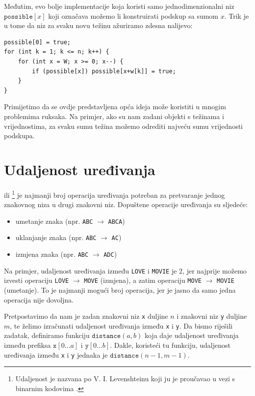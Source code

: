 Međutim, evo bolje implementacije koja koristi samo
jednodimenzionalni niz $\texttt{possible}[x]$
koji označava možemo li konstruirati podskup sa sumom $x$.
Trik je u tome da niz za svaku novu težinu
ažuriramo zdesna nalijevo:
\begin{lstlisting}
possible[0] = true;
for (int k = 1; k <= n; k++) {
    for (int x = W; x >= 0; x--) {
        if (possible[x]) possible[x+w[k]] = true;
    }
}
\end{lstlisting}

Primijetimo da se ovdje predstavljena opća ideja može koristiti
u mnogim problemima ruksaka.
Na primjer, ako su nam zadani objekti s težinama i vrijednostima,
za svaku sumu težina možemo odrediti najveću sumu
vrijednosti podskupa.

\section{Udaljenost uređivanja}


 ili \footnote{Udaljenost
je nazvana po V. I. Levenshteinu koji ju je proučavao u vezi s binarnim kodovima \cite{lev66}.}
je najmanji broj operacija uređivanja
potreban za pretvaranje jednog znakovnog niza
u drugi znakovni niz.
Dopuštene operacije uređivanja su sljedeće:
\begin{itemize}
\item umetanje znaka (npr. \texttt{ABC} $\rightarrow$ \texttt{ABCA})
\item uklanjanje znaka (npr. \texttt{ABC} $\rightarrow$ \texttt{AC})
\item izmjena znaka (npr. \texttt{ABC} $\rightarrow$ \texttt{ADC})
\end{itemize}

Na primjer, udaljenost uređivanja između
\texttt{LOVE} i \texttt{MOVIE} je 2,
jer najprije možemo izvesti operaciju
 \texttt{LOVE} $\rightarrow$ \texttt{MOVE}
(izmjena), a zatim operaciju
\texttt{MOVE} $\rightarrow$ \texttt{MOVIE}
(umetanje).
To je najmanji mogući broj operacija,
jer je jasno da samo jedna operacija nije dovoljna.

Pretpostavimo da nam je zadan znakovni niz \texttt{x}
duljine $n$ i znakovni niz \texttt{y} duljine $m$,
te želimo izračunati udaljenost uređivanja između
\texttt{x} i \texttt{y}.
Da bismo riješili zadatak, definiramo funkciju
$\texttt{distance}(a,b)$ koja daje
udaljenost uređivanja između prefiksa
$\texttt{x}[0 \ldots a]$ i $\texttt{y}[0 \ldots b]$.
Dakle, koristeći tu funkciju, udaljenost uređivanja
između \texttt{x} i \texttt{y} jednaka je $\texttt{distance}(n-1,m-1)$.

